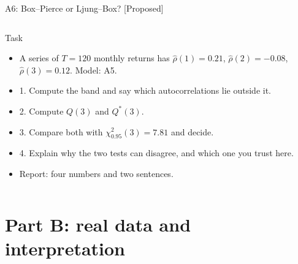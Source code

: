 \begin{frame}{A6: Box--Pierce or Ljung--Box? [Proposed]}
\propsub
\itemsize{\scriptsize}
\begin{columns}[T]
\begin{column}{\taskw}
\begin{block}{Task}
\begin{itemize}
    \item A series of $T = 120$ monthly returns has $\hat\rho(1) = 0.21$, $\hat\rho(2) = -0.08$, $\hat\rho(3) = 0.12$. Model: A5.
    \item 1. Compute the band and say which autocorrelations lie outside it.
    \item 2. Compute $Q(3)$ and $Q^*(3)$.
    \item 3. Compare both with $\chi^2_{0.95}(3) = 7.81$ and decide.
    \item 4. Explain why the two tests can disagree, and which one you trust here.
    \item Report: four numbers and two sentences.
\end{itemize}
\end{block}
\end{column}
\begin{column}{\solw}
\end{column}
\end{columns}
\end{frame}


\section{Part B: real data and interpretation}

